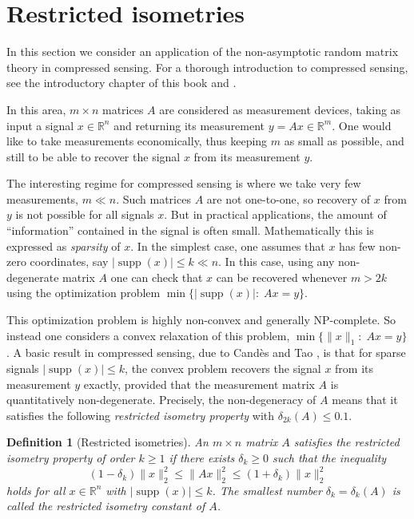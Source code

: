 \documentclass[10pt, openany]{book}
\newtheorem*{definition-notag}{Definition}
\theoremstyle{remark}
\DeclareMathOperator{\supp}{supp}
\def \R {\mathbb{R}}
\def \d {\delta}
\begin{document}
\section{Restricted isometries}			\label{s: restricted isometries}

In this section we consider an application of the non-asymptotic random matrix theory
in compressed sensing. 
For a thorough introduction to compressed sensing, see the introductory chapter of
this book and \cite{FR, CS website}. 

In this area, $m \times n$ matrices $A$ 
are considered as measurement devices, taking as input a signal $x \in \R^n$ and returning 
its measurement $y = Ax \in \R^m$. One would like to take measurements economically, 
thus keeping $m$ as small as possible, and still to be able to recover the signal $x$ from its 
measurement $y$. 

The interesting regime for compressed sensing is where we take 
very few measurements, $m \ll n$. Such matrices $A$ are not one-to-one, 
so recovery of $x$ from $y$ is not possible for all signals $x$. 
But in practical applications, the amount of ``information'' contained in the signal is often small. 
Mathematically this is expressed as {\em sparsity} of $x$.
In the simplest case, one assumes that $x$ has few non-zero coordinates, say 
$|\supp(x)| \le k \ll n$. In this case, using any non-degenerate matrix $A$ one can check 
that $x$ can be recovered whenever $m > 2k$ using the optimization problem 
$\min \{ |\supp(x)|: \; Ax=y \}$.

This optimization problem is highly non-convex and generally NP-complete. 
So instead one considers a convex relaxation of this problem, $\min \{ \|x\|_1: \; Ax=y \}$.
A basic result in compressed sensing, due to Cand\`es and Tao \cite{Candes-Tao, Candes}, 
is that for sparse signals $|\supp(x)| \le k$,
the convex problem recovers the signal $x$ from its measurement $y$ exactly, provided 
that the measurement matrix $A$ is quantitatively non-degenerate. Precisely, the non-degeneracy  
of $A$ means that it satisfies the following {\em restricted isometry property} with $\d_{2k}(A) \le 0.1$.

\begin{definition-notag}[Restricted isometries] 
  An $m \times n$ matrix $A$ satisfies the {\em restricted isometry property} of order $k \ge 1$ if
  there exists $\d_k \ge 0$ such that the inequality
  \begin{equation}							\label{eq RIP}
  (1-\d_k) \|x\|_2^2 \le \|Ax\|_2^2 \le (1+\d_k) \|x\|_2^2
  \end{equation}
  holds for all $x \in \R^n$ with $|\supp(x)| \le k$.
  The smallest number $\d_k = \d_k(A)$ is called the {\em restricted isometry constant} of $A$. 
\end{definition-notag}
\end{document}
